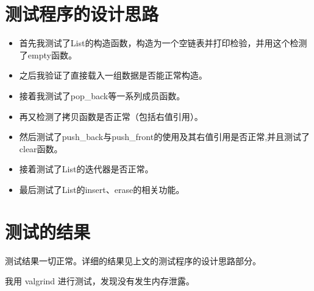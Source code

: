 \documentclass[UTF8]{ctexart}
\begin{document}
\pagestyle{fancy}
\fancyhead{}

\section{测试程序的设计思路}

\begin{itemize}

\item 首先我测试了List的构造函数，构造为一个空链表并打印检验，并用这个检测了empty函数。  
\item 之后我验证了直接载入一组数据是否能正常构造。  
\item 接着我测试了pop\_back等一系列成员函数。  
\item 再又检测了拷贝函数是否正常（包括右值引用）。  
\item 然后测试了push\_back与push\_front的使用及其右值引用是否正常,并且测试了clear函数。  
\item 接着测试了List的迭代器是否正常。  
\item 最后测试了List的insert、erase的相关功能。 

\end{itemize}

\section{测试的结果}

测试结果一切正常。详细的结果见上文的测试程序的设计思路部分。

我用 valgrind 进行测试，发现没有发生内存泄露。
\end{document}
